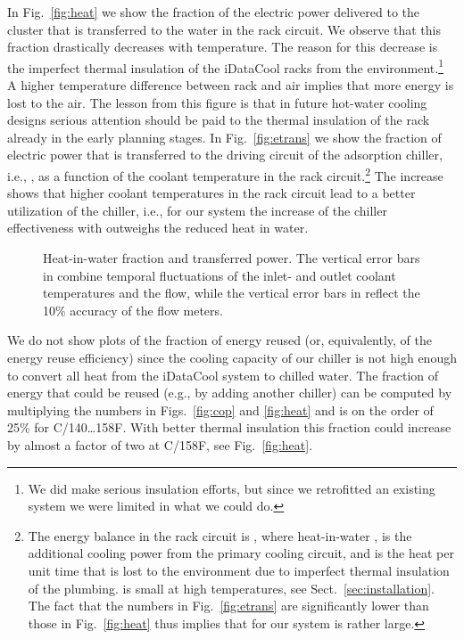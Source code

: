 In Fig.~\ref{fig:heat} we show the fraction of the electric power
delivered to the cluster that is transferred to the water in the rack
circuit.  We observe that this fraction drastically decreases with
temperature.  The reason for this decrease is the imperfect thermal
insulation of the iDataCool racks from the environment.\footnote{We
  did make serious insulation efforts, but since we retrofitted an
  existing system we were limited in what we could do.}  A higher
temperature difference between rack and air implies that more energy
is lost to the air.  The lesson from this figure is that in future
hot-water cooling designs serious attention should be paid to the
thermal insulation of the rack already in the early planning stages.
In Fig.~\ref{fig:etrans} we show the fraction of electric power that
is transferred to the driving circuit of the adsorption chiller, i.e.,
, as a function of the coolant temperature in
the rack circuit.\footnote{The energy balance in the rack circuit is
  , where 
   heat-in-water ,
   is the additional cooling power
  from the primary cooling circuit, and  is the heat
  per unit time that is lost to the environment due to imperfect
  thermal insulation of the plumbing.   is small at high
  temperatures, see Sect.~\ref{sec:installation}.  The fact that the
  numbers in Fig.~\ref{fig:etrans} are significantly lower than those
  in Fig.~\ref{fig:heat} thus implies that for our system
   is rather large.} The increase shows that higher
coolant temperatures in the rack circuit lead to a better utilization
of the chiller, i.e., for our system the increase of the chiller
effectiveness with  outweighs the reduced heat in
water.

\begin{figure}[t]
  \centering
  \hfill
  \vspace*{-3mm}
  \caption{ Heat-in-water fraction and
     transferred power.  The vertical error bars in
     combine temporal fluctuations of the inlet- and
    outlet coolant temperatures and the flow, while the vertical error
    bars in  reflect the 10\% accuracy of the flow
    meters.}
\end{figure}


We do not show plots of the fraction of energy reused (or,
equivalently, of the energy reuse efficiency) since the cooling
capacity of our chiller is not high enough to convert all heat
from the iDataCool system to chilled water.  The fraction of energy
that could be reused (e.g., by adding another chiller) can be computed
by multiplying the numbers in Figs.~\ref{fig:cop} and \ref{fig:heat}
and is on the order of 25\% for
C/140\ldots158F.  With better thermal
insulation this fraction could increase by almost a factor of two at
C/158F, see Fig.~\ref{fig:heat}.

